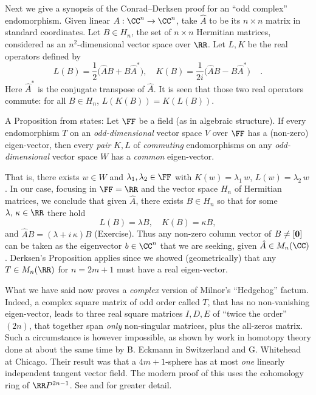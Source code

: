 \bigskip

Next we give a synopsis of the Conrad--Derksen proof for an ``odd complex'' endomorphism. Given linear $A: \CC^n \to \CC^n$, take $\hat{A}$ to be its $n\times n$ matrix in standard coordinates.
Let $B \in H_n$, the set of $n\times n$ Hermitian matrices, considered as an $n^2$-dimensional vector space over $\RR$. Let $L, K$ be the real operators defined by
$$L(B) =\frac{1}{2}\bigl(\hat{A}B + B\hat{A}^*\bigr), \quad K(B) = \frac{1}{2i}\bigl(\hat{A}B-B\hat{A}^*\bigr)\,\quad.$$
Here $\hat{A}^*$ is the conjugate transpose of $\hat{A}$. It is seen that those two real operators commute: for all $B \in H_n$, $L(K(B)) = K(L(B))$.

A Proposition from \cite{Derksen} states: Let $\FF$ be a field (as in algebraic structure). If every endomorphism $T$ on an {\it odd-dimensional} vector space $V$ over $\FF$ has a (non-zero) eigen-vector, then every {\it pair} $K,L$ of {\it commuting} endomorphisms on any {\it odd-dimensional} vector space $W$ has a {\it common} eigen-vector.

That is, there exists $w \in W$ and $\lambda_1, \lambda_2 \in \FF$ with $K(w) = \lambda_1\, w$, $L(w) = \lambda_2\, w$. In our case, focusing in $\FF=\RR$ and the vector space $H_n$ of Hermitian matrices, we conclude that given $\hat{A}$, there exists $B \in H_n$ so that for some $\lambda ,\, \kappa \in \RR$ there hold
 $$L(B) = \lambda B,\quad K(B) = \kappa B,$$
and $\hat{A}B = \left(\lambda + i\, \kappa\right) B$ (Exercise). Thus any non-zero column vector of $B \ne [\bold 0]$ can be taken as the eigenvector $b \in \CC^n$ that we are seeking, given
$\hat{A}\in M_n (\CC )$. Derksen's Proposition applies since we showed (geometrically) that any $T \in M_n (\RR)$ for $n = 2m+1$ must have a real eigen-vector.

 What we have said now proves a {\it complex} version of Milnor's ``Hedgehog'' factum. Indeed, a complex square matrix of odd order called $T$, that has no non-vanishing eigen-vector, leads to three real square matrices $I, D, E$ of ``twice the order'' $(2n)$, that together span {\it only} non-singular matrices, plus the all-zeros matrix. Such a circumstance is however impossible, as shown by work in homotopy theory done at about the same time by B. Eckmann in Switzerland and G. Whitehead at Chicago. Their result was that a $4m+1$-sphere has at most {\it one} linearly independent tangent vector field. The modern proof of this uses the cohomology ring of $\RR P^{2n-1}$. See \cite{Eckmann} and \cite{Whitehead} for greater detail.

